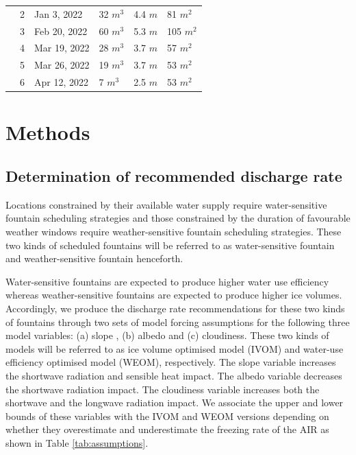 \documentclass[tc, manuscript]{copernicus}
\begin{document}
\begin{table}
\begin{tabular}{@{}|llllll|@{}}
		\multicolumn{1}{|l|}{} & 2            & Jan 3, 2022   & 32 $m^{3}$      & 4.4 $m$
		                       & 81 $m^{2}$                                                                       \\
		\multicolumn{1}{|l|}{} & 3            & Feb 20, 2022   & 60 $m^{3}$      & 5.3 $m$
		                       & 105 $m^{2}$                                                                       \\
		\multicolumn{1}{|l|}{} & 4            & Mar 19, 2022   & 28 $m^{3}$      & 3.7 $m$
		                       & 57 $m^{2}$                                                                       \\
		\multicolumn{1}{|l|}{} & 5            & Mar 26, 2022   & 19 $m^{3}$      & 3.7 $m$
		                       & 53 $m^{2}$                                                                       \\
		\multicolumn{1}{|l|}{} & 6            & Apr 12, 2022   & 7 $m^{3}$      & 2.5 $m$
		                       & 53 $m^{2}$                                                                       \\
		\bottomrule
	\end{tabular}

\end{table}

\section{Methods}

\subsection{Determination of recommended discharge rate}

Locations constrained by their available water supply require water-sensitive fountain scheduling strategies and
those constrained by the duration of favourable weather windows require weather-sensitive fountain scheduling
strategies. These two kinds of scheduled fountains will be referred to as water-sensitive fountain and
weather-sensitive fountain henceforth.

Water-sensitive fountains are expected to produce higher water use efficiency whereas weather-sensitive fountains
are expected to produce higher ice volumes. Accordingly, we produce the discharge rate recommendations for these
two kinds of fountains through two sets of model forcing assumptions for the following three model variables:
(a) slope , (b) albedo and (c) cloudiness.  These two kinds of models will be referred to as ice volume
optimised model (IVOM) and water-use efficiency optimised model (WEOM), respectively. The slope variable
increases the shortwave radiation and sensible heat impact. The albedo variable decreases the shortwave
radiation impact. The cloudiness variable increases both the shortwave and the longwave radiation impact. We
associate the upper and lower bounds of these variables with the IVOM and WEOM versions depending on whether
they overestimate and underestimate the freezing rate of the AIR as shown in Table \ref{tab:assumptions}.
\end{document}
